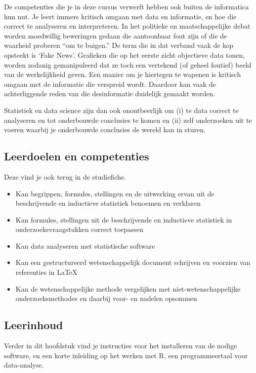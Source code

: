 De competenties die je in deze cursus verwerft hebben ook buiten de informatica hun nut. Je leert immers kritisch omgaan met data en informatie, en hoe die correct te analyseren en interpreteren. In het politieke en maatschappelijke debat worden moedwillig beweringen gedaan die aantoonbaar fout zijn of die de waarheid proberen ``om te buigen.'' De term die in dat verband vaak de kop opsteekt is `Fake News'. Grafieken die op het eerste zicht objectieve data tonen, worden zodanig gemanipuleerd dat ze toch een vertekend (of geheel foutief) beeld van de werkelijkheid geven. Een manier om je hiertegen te wapenen is kritisch omgaan met de informatie die verspreid wordt. Daardoor kan vaak de achterliggende reden van die desinformatie duidelijk gemaakt worden.

Statistiek  en data science zijn dan ook onontbeerlijk om (i) te data correct te analyseren en tot onderbouwde conclusies te komen en (ii) zelf onderzoeken uit te voeren waarbij je onderbouwde conclusies de wereld kan in sturen. 

\subsection{Leerdoelen en competenties}

Deze vind je ook terug in de studiefiche.

\begin{itemize}
  \item Kan begrippen, formules, stellingen en de uitwerking ervan uit de beschrijvende en inductieve statistiek benoemen en verklaren
  \item Kan formules, stellingen uit de beschrijvende en inductieve statistiek in onderzoeksvraagstukken correct toepassen
  \item Kan data analyseren met statistische software
  \item Kan een gestructureerd wetenschappelijk document schrijven en voorzien van referenties in \LaTeX{}
  \item Kan de wetenschappelijke methode vergelijken met niet-wetenschappelijke onderzoeksmethodes en daarbij voor- en nadelen opsommen 
\end{itemize}

\subsection{Leerinhoud}

Verder in dit hoofdstuk vind je instructies voor het installeren van de nodige software, en een korte inleiding op het werken met R, een programmeertaal voor data-analyse.

